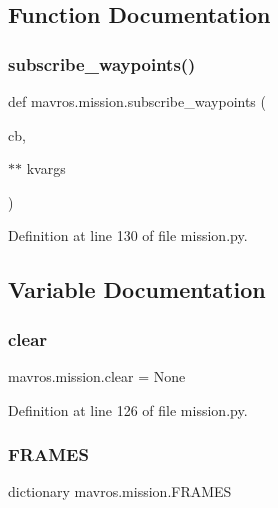 \subsection{Function Documentation}
\mbox{\label{namespacemavros_1_1mission_ada55b002a31f5466e6113778ed0a9bf1}} 
\subsubsection{\texorpdfstring{subscribe\_waypoints()}{subscribe\_waypoints()}}
{\footnotesize\ttfamily def mavros.\+mission.\+subscribe\+\_\+waypoints (\begin{DoxyParamCaption}\item[{}]{cb,  }\item[{$\ast$$\ast$}]{kvargs }\end{DoxyParamCaption})}



Definition at line 130 of file mission.\+py.



\subsection{Variable Documentation}
\mbox{\label{namespacemavros_1_1mission_afa08761df27335178281b14e9b55a445}} 
\subsubsection{\texorpdfstring{clear}{clear}}
{\footnotesize\ttfamily mavros.\+mission.\+clear = None}



Definition at line 126 of file mission.\+py.

\mbox{\label{namespacemavros_1_1mission_af5ff79b68cc30a1e3fe1f728ad049643}} 
\subsubsection{\texorpdfstring{FRAMES}{FRAMES}}
{\footnotesize\ttfamily dictionary mavros.\+mission.\+F\+R\+A\+M\+ES}

